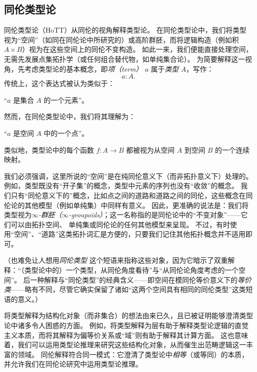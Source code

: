 \subsection*{同伦类型论}

同伦类型论（HoTT）从同伦的视角解释类型论。
在同伦类型论中，我们将类型视为“空间”（如同在同伦论中所研究的）或高阶群胚，而将逻辑构造（例如积 $A\times B$）视为在这些空间上的同伦不变构造。
如此一来，我们便能直接处理空间，无需先发展点集拓扑学（或任何组合替代物，如单纯集合论）。
为简要解释这一视角，先考虑类型论的基本概念，即\emph{项（term）} $a$ 属于\emph{类型} $A$，写作：
\[ a:A. \]
传统上，这个表达式被认为类似于：

\begin{center}
``$a$ 是集合 $A$ 的一个元素''。
\end{center}

然而，在同伦类型论中，我们将其理解为：

\begin{center}
``$a$ 是空间 $A$ 中的一个点''。
\end{center}

%
类似地，类型论中的每个函数 $f : A\to B$ 都被视为从空间 $A$ 到空间 $B$ 的一个连续映射。

我们必须强调，这里所说的``空间''是在纯同伦意义下（而非拓扑意义下）处理的。
例如，类型既没有``开子集''的概念，类型中元素的序列也没有``收敛''的概念。
我们只有``同伦意义下的''概念，比如点之间的道路和道路之间的同伦，这些概念在同伦论的其他模型（例如单纯集）中同样有意义。
因此，更准确的说法是：我们将类型视为\emph{$\infty$-群胚（$\infty$-groupoids）}；这一名称指的是同伦论中的``不变对象''——它们可以由拓扑空间、
%
单纯集或同伦论的任何其他模型来呈现。
不过，有时使用``空间''、``道路''这类拓扑词汇是方便的，只要我们记住其他拓扑概念并不适用即可。

（也难免让人想用\emph{同伦类型}
%
这个短语来指称这些对象，因为它暗示了双重解释：``（类型论中的）一个类型，从同伦角度看待''与``从同伦论角度考虑的一个空间''。
后一种解释与``同伦类型''的经典含义——即空间在模同伦等价意义下的\emph{等价类}——略有不同，尽管它确实保留了诸如``这两个空间具有相同的同伦类型''这类短语的意义。）

将类型解释为结构化对象（而非集合）的想法由来已久，且已被证明能够澄清类型论中诸多令人困惑的方面。
例如，将类型解释为层有助于解释类型论逻辑的直觉主义本质，而将其解释为偏等价关系或``域''则有助于解释其计算方面。
这也意味着，我们可以运用类型论推理来研究这些结构化对象，从而催生出范畴逻辑这一丰富的领域。
同伦解释符合同一模式：它澄清了类型论中\emph{相等}（或等同）的本质，并允许我们在同伦论研究中运用类型论推理。

